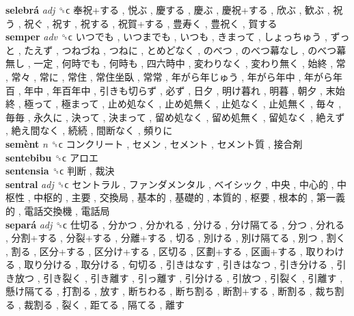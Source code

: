 \textbf{selebrá} \emph{adj}  ␝ϲ   奉祝+する ,  悦ぶ ,  慶する ,  慶ぶ ,  慶祝+する ,  欣ぶ ,  歓ぶ ,  祝う ,  祝ぐ ,  祝す ,  祝する ,  祝賀+する ,  豊寿く ,  豊祝く ,  賀する   \\
\textbf{semper} \emph{adv}  ␝ϲ   いつでも ,  いつまでも ,  いつも ,  きまって ,  しょっちゅう ,  ずっと ,  たえず ,  つねづね ,  つねに ,  とめどなく ,  のべつ ,  のべつ幕なし ,  のべつ幕無し ,  一定 ,  何時でも ,  何時も ,  四六時中 ,  変わりなく ,  変わり無く ,  始終 ,  常 ,  常々 ,  常に ,  常住 ,  常住坐臥 ,  常常 ,  年がら年じゅう ,  年がら年中 ,  年がら年百 ,  年中 ,  年百年中 ,  引きも切らず ,  必ず ,  日夕 ,  明け暮れ ,  明暮 ,  朝夕 ,  末始終 ,  極って ,  極まって ,  止め処なく ,  止め処無く ,  止処なく ,  止処無く ,  毎々 ,  毎毎 ,  永久に ,  決って ,  決まって ,  留め処なく ,  留め処無く ,  留処なく ,  絶えず ,  絶え間なく ,  続続 ,  間断なく ,  頻りに   \\
\textbf{semènt} \emph{n}  ␝ϲ   コンクリート ,  セメン ,  セメント ,  セメント質 ,  接合剤   \\
\textbf{sentebibu} ␝ϲ   アロエ   \\
\textbf{sentensia} ␝ϲ   判断 ,  裁決   \\
\textbf{sentral} \emph{adj}  ␝ϲ   セントラル ,  ファンダメンタル ,  ベイシック ,  中央 ,  中心的 ,  中枢性 ,  中枢的 ,  主要 ,  交換局 ,  基本的 ,  基礎的 ,  本質的 ,  枢要 ,  根本的 ,  第一義的 ,  電話交換機 ,  電話局   \\
\textbf{separá} \emph{adj}  ␝ϲ   仕切る ,  分かつ ,  分かれる ,  分ける ,  分け隔てる ,  分つ ,  分れる ,  分割+する ,  分裂+する ,  分離+する ,  切る ,  別ける ,  別け隔てる ,  別つ ,  割く ,  割る ,  区分+する ,  区分け+する ,  区切る ,  区劃+する ,  区画+する ,  取りわける ,  取り分ける ,  取分ける ,  句切る ,  引きはなす ,  引きはなつ ,  引き分ける ,  引き放つ ,  引き裂く ,  引き離す ,  引っ離す ,  引分ける ,  引放つ ,  引裂く ,  引離す ,  懸け隔てる ,  打割る ,  放す ,  断ちわる ,  断ち割る ,  断割+する ,  断割る ,  裁ち割る ,  裁割る ,  裂く ,  距てる ,  隔てる ,  離す   \\
